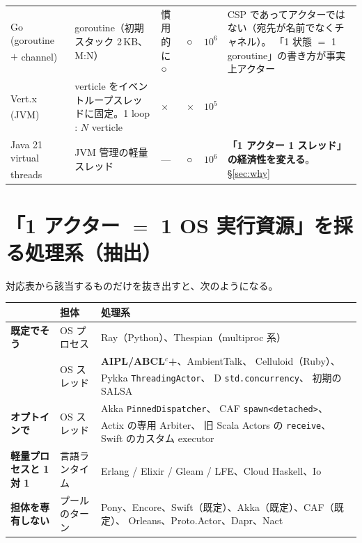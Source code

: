 \documentclass[11pt,a4paper]{ltjsarticle}
\newcommand{\dg}{\textsuperscript{\dag}}
\newcommand{\yes}{\textbf{○}}
\newcommand{\no}{×}
\begin{document}
\begin{landscape}
\begin{longtable}{@{}p{3.3cm}p{4.6cm}>{\raggedright\arraybackslash}p{2.5cm}>{\raggedright\arraybackslash}p{2.6cm}>{\raggedright\arraybackslash}p{1.5cm}p{6.0cm}@{}}
Go (goroutine $+$ channel)\dg
  & goroutine（初期スタック 2\,KB、M:N）
  & 慣用的に \yes
  & \yes
  & $10^{6}$
  & CSP であってアクターではない（宛先が名前でなくチャネル）。
    「1 状態 $=$ 1 goroutine」の書き方が事実上アクター \\

Vert.x (JVM)\dg
  & verticle をイベントループスレッドに固定。1 loop : $N$ verticle
  & \no
  & \no
  & $10^{5}$
  & \\

Java 21 virtual threads\dg
  & JVM 管理の軽量スレッド
  & ---
  & \yes
  & $10^{6}$
  & \textbf{「1 アクター 1 スレッド」の経済性を変える}。
    \S\ref{sec:why} \\
\end{longtable}
\end{landscape}

\section{「1 アクター $=$ 1 OS 実行資源」を採る処理系（抽出）}
\label{sec:oneone}

対応表から該当するものだけを抜き出すと、次のようになる。

\begin{center}
\small
\begin{tabular}{@{}llp{7.4cm}@{}}
\toprule
 & 担体 & 処理系 \\
\midrule
\textbf{既定でそう} & OS プロセス & Ray（Python）、Thespian（multiproc 系） \\
                    & OS スレッド & \textbf{AIPL/ABCL$^{c}$+}、AmbientTalk、
                                    Celluloid（Ruby）、Pykka \texttt{ThreadingActor}、
                                    D \texttt{std.concurrency}\dg、
                                    初期の SALSA \\
\midrule
\textbf{オプトインで} & OS スレッド & Akka \texttt{PinnedDispatcher}、
                                      CAF \texttt{spawn<detached>}、
                                      Actix の専用 Arbiter\dg、
                                      旧 Scala Actors の \texttt{receive}、
                                      Swift のカスタム executor \\
\midrule
\textbf{軽量プロセスと 1 対 1} & 言語ランタイム
                    & Erlang / Elixir / Gleam / LFE、Cloud Haskell\dg、Io\dg \\
\midrule
\textbf{担体を専有しない} & プールのターン
                    & Pony、Encore、Swift（既定）、Akka（既定）、CAF（既定）、
                      Orleans、Proto.Actor、Dapr、Nact \\
\bottomrule
\end{tabular}
\end{center}
\end{document}
